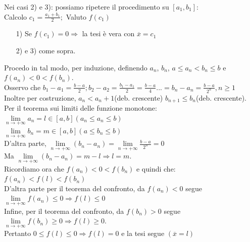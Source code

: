 \documentclass{article}
\newcommand{\vSpace}{\vspace{1em}}
\newcommand{\hSpace}{\hspace{1em}}
\begin{document}
\begin{flushleft}
Nei casi 2) e 3): possiamo ripetere il procedimento su $[a_1, b_1]$:\\
Calcolo $c_1 = \frac{a_1 + b_1}{2};$ Valuto $f(c_1)$\\
\begin{enumerate}
    \item[1)] Se $f(c_1) = 0 \Rightarrow$ la tesi è vera con $\overline{x} = c_1$\\
    \item[2)] e 3) come sopra. 
\end{enumerate}

Procedo in tal modo, per induzione, definendo $a_n$, $b_n$, $a \leq a_n < b_n \leq b$ e $f(a_n) < 0 < f(b_n)$.\\
Osservo che $b_1 - a_1 = \frac{b-a}{2}; b_2-a_2 = \frac{b_1-a_1}{2} = \frac{b-a}{4}...=b_n - a_n = \frac{b-a}{2^n}, n \geq 1$\\
Inoltre per costruzione, $a_n < a_n+1$(deb. crescente) $b_{n+1} \leq b_n$(deb. crescente).\\
Per il teorema sui limiti delle funzione monotone:\\
\hSpace $\lim\limits_{n \to + \infty}a_n = l \in [a,b] (a_n \leq a_n \leq b)$\\
\hSpace $\lim\limits_{n \to + \infty}b_n = m \in [a,b] (a \leq b_n \leq b)$\\
D'altra parte, $\lim\limits_{n \to + \infty}(b_n - a_n) = \lim\limits_{n \to + \infty}\frac{b-a}{2^n} = 0$\\
Ma $\lim\limits_{n \to + \infty} (b_n - a_n) = m - l \Rightarrow l = m$.\\
Ricordiamo ora che $f(a_n) < 0 < f(b_n)$ e quindi che: $f(a_n) < f(l) < f(b_n)$\\
\vSpace
D'altra parte per il teorema del confronto, da $f(a_n) < 0$ segue $\lim\limits_{n \to + \infty}f(a_n) \leq 0 \Rightarrow f(l) \leq 0$\\
Infine, per il teorema del confronto, da $f(b_n) > 0 $ segue $\lim\limits_{n \to + \infty}f(b_n) \geq 0 \Rightarrow f(l) \geq 0$.\\
Pertanto $0 \leq f(l) \leq 0 \Rightarrow f(l) = 0$ e la tesi segue $(\overline{x} = l)$
\end{flushleft}
\end{document}
